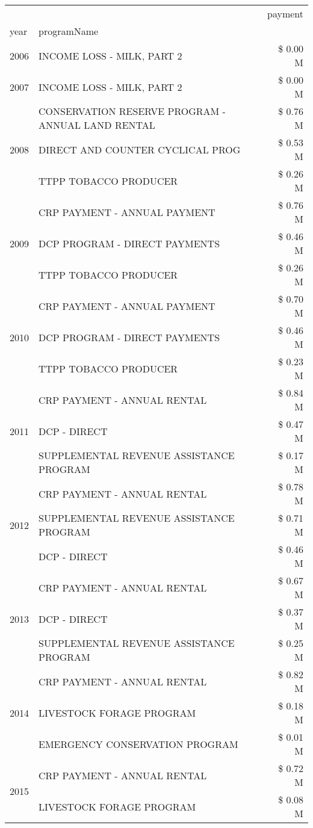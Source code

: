 \begin{tabular}{llr}
\toprule
 &  & payment \\
year & programName &  \\
\midrule
2006 & INCOME LOSS - MILK, PART 2 & \$ 0.00 M \\
\cline{1-3}
2007 & INCOME LOSS - MILK, PART 2 & \$ 0.00 M \\
\cline{1-3}
\multirow[t]{3}{*}{2008} & CONSERVATION RESERVE PROGRAM - ANNUAL LAND RENTAL & \$ 0.76 M \\
 & DIRECT AND COUNTER CYCLICAL PROG & \$ 0.53 M \\
 & TTPP TOBACCO PRODUCER & \$ 0.26 M \\
\cline{1-3}
\multirow[t]{3}{*}{2009} & CRP PAYMENT - ANNUAL PAYMENT & \$ 0.76 M \\
 & DCP PROGRAM - DIRECT PAYMENTS & \$ 0.46 M \\
 & TTPP TOBACCO PRODUCER & \$ 0.26 M \\
\cline{1-3}
\multirow[t]{3}{*}{2010} & CRP PAYMENT - ANNUAL PAYMENT & \$ 0.70 M \\
 & DCP PROGRAM - DIRECT PAYMENTS & \$ 0.46 M \\
 & TTPP TOBACCO PRODUCER & \$ 0.23 M \\
\cline{1-3}
\multirow[t]{3}{*}{2011} & CRP PAYMENT - ANNUAL RENTAL & \$ 0.84 M \\
 & DCP - DIRECT & \$ 0.47 M \\
 & SUPPLEMENTAL REVENUE ASSISTANCE PROGRAM & \$ 0.17 M \\
\cline{1-3}
\multirow[t]{3}{*}{2012} & CRP PAYMENT - ANNUAL RENTAL & \$ 0.78 M \\
 & SUPPLEMENTAL REVENUE ASSISTANCE PROGRAM & \$ 0.71 M \\
 & DCP - DIRECT & \$ 0.46 M \\
\cline{1-3}
\multirow[t]{3}{*}{2013} & CRP PAYMENT - ANNUAL RENTAL & \$ 0.67 M \\
 & DCP - DIRECT & \$ 0.37 M \\
 & SUPPLEMENTAL REVENUE ASSISTANCE PROGRAM & \$ 0.25 M \\
\cline{1-3}
\multirow[t]{3}{*}{2014} & CRP PAYMENT - ANNUAL RENTAL & \$ 0.82 M \\
 & LIVESTOCK FORAGE PROGRAM & \$ 0.18 M \\
 & EMERGENCY CONSERVATION PROGRAM & \$ 0.01 M \\
\cline{1-3}
\multirow[t]{3}{*}{2015} & CRP PAYMENT - ANNUAL RENTAL & \$ 0.72 M \\
 & LIVESTOCK FORAGE PROGRAM & \$ 0.08 M \\

\end{tabular}
